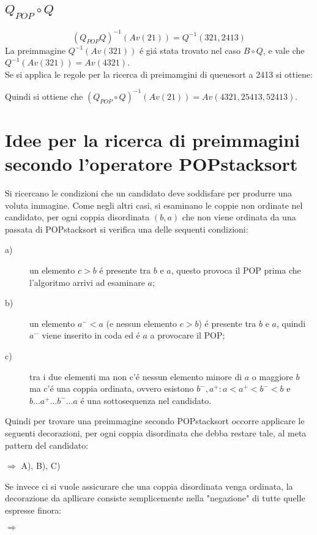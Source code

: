 \subsection*{$Q_{POP}\circ{Q}$}
$$(Q_{POP}{Q})^{-1}(Av(21)) = Q^{-1}(321, 2413)$$
La preimmagine $Q^{-1}(Av(321))$ \'e gi\'a stata trovato nel caso $B\circ{Q}$, e vale che $Q^{-1}(Av(321)) = Av(4321)$.\\
Se si applica le regole per la ricerca di preimamgini di queuesort a 2413 si ottiene:
\begin{center}\end{center}
Quindi si ottiene che $(Q_{POP}\circ{Q})^{-1}(Av(21)) = Av(4321, 25413, 52413)$.
\section*{Idee per la ricerca di preimmagini secondo l'operatore POPstacksort}
Si ricercano le condizioni che un candidato deve soddisfare per produrre una voluta immagine. Come negli altri casi, si esaminano le coppie non ordinate nel candidato, per ogni coppia disordinata $(b,a)$ che non viene ordinata da una passata di POPstacksort si verifica una delle sequenti condizioni:
\begin{description}
	\item[a)] un elemento $c>b$ \'e presente tra $b$ e $a$, questo provoca il POP prima che l'algoritmo arrivi ad esaminare $a$;
	\item[b)] un elemento $a^-<a$ (e nessun elemento $c>b$) \'e presente tra $b$ e $a$, quindi $a^-$ viene inserito in coda ed \'e $a$ a provocare il POP;
	\item[c)] tra i due elementi ma non c'\'e nessun elemento minore di $a$ o maggiore $b$ ma c'\'e una coppia ordinata, ovvero esistono ${b^-,a^+}:a<a^+<b^-<b$ e $b\dots{a^+}\dots{b^-}\dots{a}$ \'e una sottosequenza nel candidato.
\end{description}
Quindi per trovare una preimmagine secondo POPstacksort occorre applicare le seguenti decorazioni, per ogni coppia disordinata che debba restare tale, al meta pattern del candidato:
\begin{center}
$\Rightarrow$
A),
B),
C)
\end{center}
Se invece ci si vuole assicurare che una coppia disordinata venga ordinata, la decorazione da apllicare consiste semplicemente nella "negazione" di tutte quelle espresse finora:
\begin{center}
$\Rightarrow$
\end{center}
